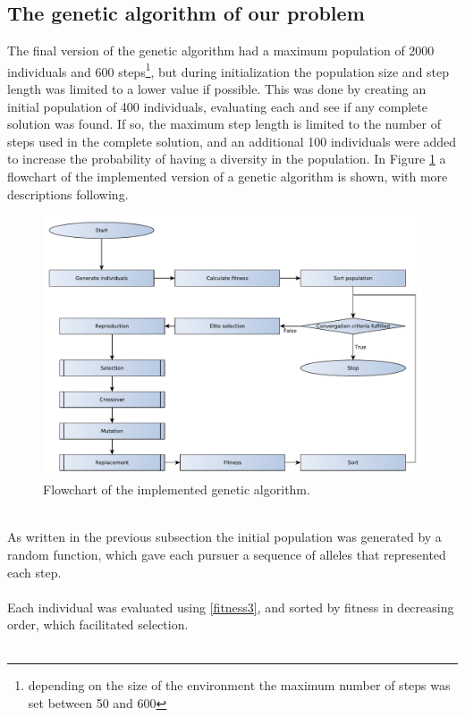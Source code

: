 \subsection{The genetic algorithm of our problem}
The final version of the genetic algorithm had a maximum population of 2000 individuals and 600 steps\footnote{depending on the size of the environment the maximum number of steps was set between 50 and 600 }, but during initialization the population size and step length was limited to a lower value if possible. This was done by creating an initial population of 400 individuals, evaluating each and see if any complete solution was found. If so, the maximum step length is limited to the number of steps used in the complete solution, and an additional 100 individuals were added to increase the probability of having a diversity in the population. In Figure \ref{GeneticFlowChart-algorithm} a flowchart of the implemented version of a genetic algorithm is shown, with more descriptions following.
\begin{figure}[!h]
	\centering
	\includegraphics[width=\textwidth]{chapter_4_methods/GeneticFlowChart-Algorithm}
	\caption[Flowchart of the implemented genetic algorithm]
	{Flowchart of the implemented genetic algorithm.}
	\label{GeneticFlowChart-algorithm}
\end{figure}
\\As written in the previous subsection the initial population was generated by a random function, which gave each pursuer a sequence of alleles that represented each step.\\\\
Each individual was evaluated using \eqref{fitness3}, and sorted by fitness in decreasing order, which facilitated selection.\\\\
